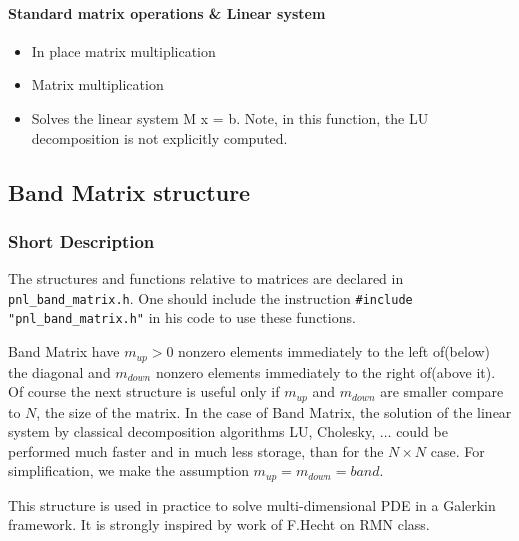 \paragraph{Standard matrix operations \& Linear system}
\begin{itemize}
\item {}
  \sshortdescribe In place matrix multiplication  
\item {}
  \sshortdescribe Matrix multiplication  
\item {}
  \sshortdescribe Solves the linear system M x = b. Note, in this function, the LU decomposition
  is not explicitly computed.
\end{itemize}



\subsection{Band Matrix structure}
\subsubsection{Short Description}

The structures and functions relative to matrices are declared in
\verb!pnl_band_matrix.h!. One should include the instruction
\verb!#include "pnl_band_matrix.h"! in his code to use these functions.


Band Matrix have $m_{up}>0$ nonzero elements immediately to the left of(below)
the diagonal and $m_{down}$ nonzero elements immediately to the right of(above
it). Of course the next structure is useful only if $m_{up}$ and $m_{down}$
are smaller compare to $N$, the size of the matrix. In the case of Band
Matrix, the solution of the linear system by classical decomposition algorithms
LU, Cholesky, $\dots$ could be performed much faster and in much less storage, 
than for the $N\times N $ case. For simplification, we make the assumption $m_{up}=m_{down}=band$.


This structure is used in practice to solve multi-dimensional PDE in a Galerkin
framework. It is strongly inspired by work of F.Hecht on RMN class. 


